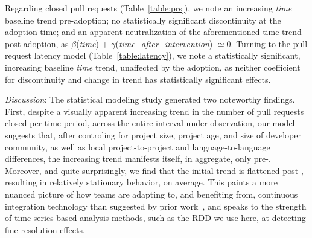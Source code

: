 Regarding closed pull requests (Table~\ref{table:prs}), we note an increasing
\emph{time} baseline trend pre-adoption; no statistically significant discontinuity
at the adoption time; and an apparent neutralization of the aforementioned time
trend post-adoption, as $\beta$(\emph{time}) $+$ 
$\gamma$(\emph{time\_after\_intervention}) $\simeq 0$.
%
Turning to the pull request latency model (Table~\ref{table:latency}), we note
a statistically significant, increasing baseline \emph{time} trend, 
unaffected by the \Tvis adoption, as neither coefficient for discontinuity and
change in trend has statistically significant effects.



\smallskip\noindent \emph{Discussion}:
The statistical modeling study generated two noteworthy findings.
First, despite a visually apparent increasing trend in the number of pull requests 
closed per time period, across the entire interval under observation, our model 
suggests that, after controling for project size, project age, and size of developer 
community, as well as local project-to-project and language-to-language differences, 
the increasing trend manifests itself, in aggregate, only pre-\Tvi.
Moreover, and quite surprisingly, we find that the initial trend is flattened post-\Tvi,
resulting in relatively stationary behavior, on average.
This paints a more nuanced picture of how \GH teams are adapting to, and
benefiting from, continuous integration technology than suggested by prior
work~\cite{VasilescuYWDF15}, and speaks to the strength of time-series-based
analysis methods, such as the RDD we use here, at detecting fine resolution effects.

